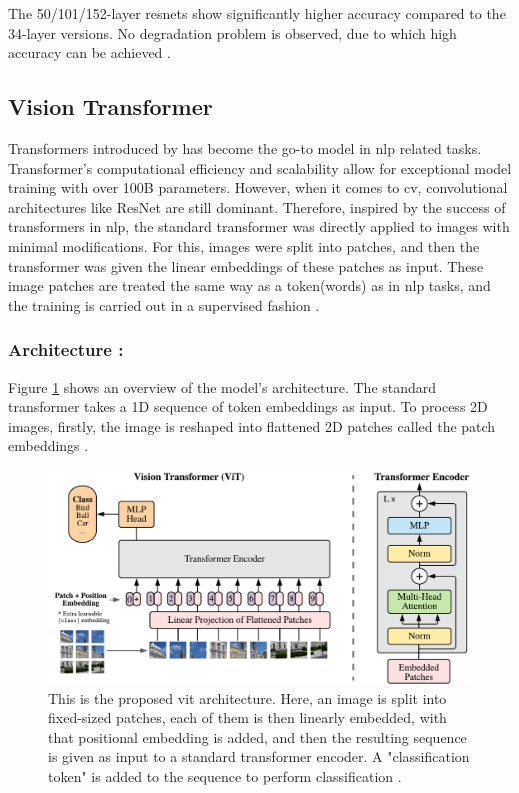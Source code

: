 The 50/101/152-layer \glspl{resnet} show significantly higher accuracy compared to the 34-layer versions. No degradation problem is observed, due to which high accuracy can be achieved \cite{he2016deep}.

\subsection{Vision Transformer}

Transformers introduced by \cite{vaswani2017attention} has become the go-to model in \gls{nlp} related tasks. Transformer's computational efficiency and scalability allow for exceptional model training with over 100B parameters. However, when it comes to \gls{cv}, convolutional architectures like ResNet\cite{he2016deep} are still dominant. Therefore, inspired by the success of transformers in \gls{nlp}, the standard transformer was directly applied to images with minimal modifications. For this, images were split into patches, and then the transformer was given the linear embeddings of these patches as input. These image patches are treated the same way as a token(words) as in \gls{nlp} tasks, and the training is carried out in a supervised fashion \cite{dosovitskiy2020image}.

\subsubsection*{Architecture :}

Figure \ref{fig:vit architecture} shows an overview of the model's architecture. The standard transformer takes a 1D sequence of token embeddings as input. To process 2D images, firstly, the image is reshaped into flattened 2D patches called the patch embeddings \cite{dosovitskiy2020image}. 

\begin{figure}[ht!]
    \centering
    \includegraphics[width=1\linewidth]{Rohit_Master_Thesis//Images/vit_architecture.pdf}
    \caption{This is the proposed \gls{vit} architecture. Here, an image is split into fixed-sized patches, each of them is then linearly embedded, with that positional embedding is added, and then the resulting sequence is given as input to a standard transformer encoder. A "classification token" is added to the sequence to perform classification \cite{dosovitskiy2020image}.}
    \label{fig:vit architecture}
\end{figure}

